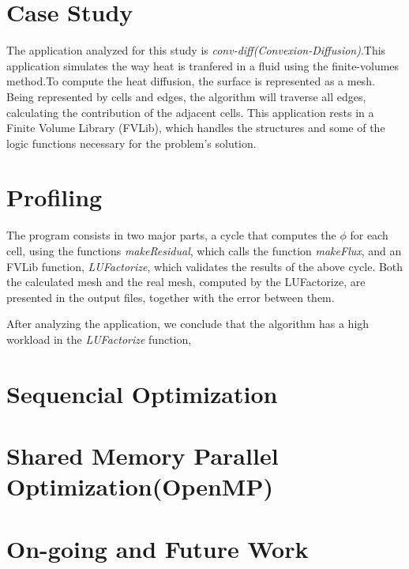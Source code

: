\documentclass[a4paper,10pt,openright,openbib,twocolumn]{article}
\begin{document}
\section{Case Study}    %

The application analyzed for this study is \emph{conv-diff(Convexion-Diffusion)}.This application simulates the way heat is tranfered in a fluid using the finite-volumes method.To compute the heat diffusion, the surface is represented as a mesh. Being represented by cells and edges, the algorithm will traverse all edges, calculating the contribution of the adjacent cells. This application rests in a Finite Volume Library (FVLib), which handles the structures and some of the logic functions necessary for the problem's solution.


\section{Profiling}    %

The program consists in two major parts, a cycle that computes the $\phi$ for each cell, using the functions \emph{makeResidual}, which calls the function \emph{makeFlux}, and an FVLib function, \emph{LUFactorize}, which validates the results of the above cycle. Both the calculated mesh and the real mesh, computed by the LUFactorize, are presented in the output files, together with the error between them.
 
After analyzing the application, we conclude that the algorithm has a high workload in the \emph{LUFactorize} function,


\section{Sequencial Optimization}


\section{Shared Memory Parallel Optimization(OpenMP)}


\section{On-going and Future Work}    %
\end{document}
